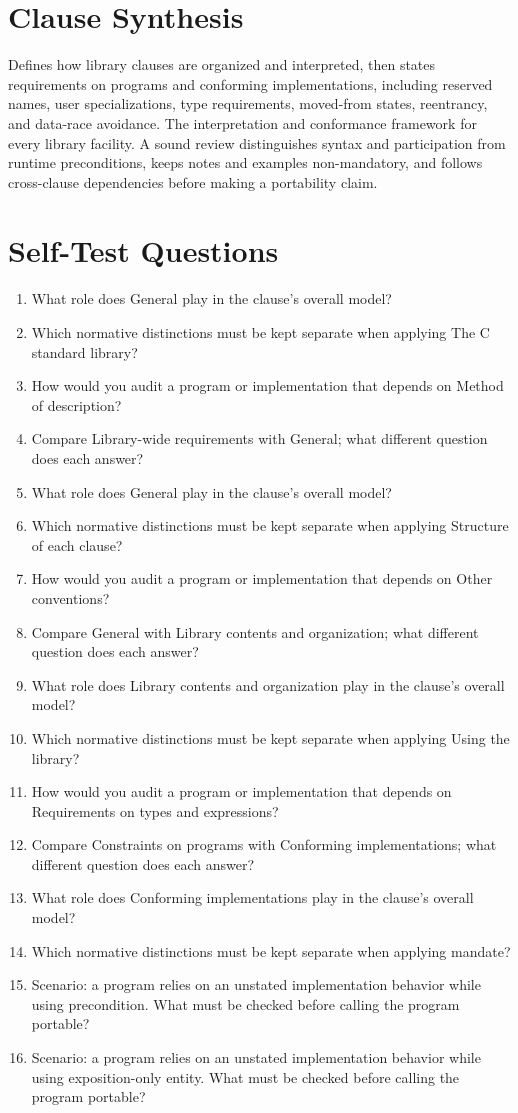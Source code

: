 \documentclass[11pt,letterpaper]{article}
\begin{document}
\section{Clause Synthesis}
\begin{CornellReferenceOrientationBox}Defines how library clauses are organized and interpreted, then states requirements on programs and conforming implementations, including reserved names, user specializations, type requirements, moved-from states, reentrancy, and data-race avoidance. The interpretation and conformance framework for every library facility. A sound review distinguishes syntax and participation from runtime preconditions, keeps notes and examples non-mandatory, and follows cross-clause dependencies before making a portability claim.\end{CornellReferenceOrientationBox}
\section{Self-Test Questions}
\begin{enumerate}
\item What role does General play in the clause's overall model?
\item Which normative distinctions must be kept separate when applying The C standard library?
\item How would you audit a program or implementation that depends on Method of description?
\item Compare Library-wide requirements with General; what different question does each answer?
\item What role does General play in the clause's overall model?
\item Which normative distinctions must be kept separate when applying Structure of each clause?
\item How would you audit a program or implementation that depends on Other conventions?
\item Compare General with Library contents and organization; what different question does each answer?
\item What role does Library contents and organization play in the clause's overall model?
\item Which normative distinctions must be kept separate when applying Using the library?
\item How would you audit a program or implementation that depends on Requirements on types and expressions?
\item Compare Constraints on programs with Conforming implementations; what different question does each answer?
\item What role does Conforming implementations play in the clause's overall model?
\item Which normative distinctions must be kept separate when applying mandate?
\item Scenario: a program relies on an unstated implementation behavior while using precondition. What must be checked before calling the program portable?
\item Scenario: a program relies on an unstated implementation behavior while using exposition-only entity. What must be checked before calling the program portable?
\end{enumerate}
\end{document}

